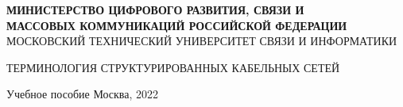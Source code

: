 \begin{titlepage}
\begin{center}
    \MakeUppercase{{\bf Министерство цифрового развития, связи и \\
    массовых коммуникаций Российской федерации}\\
    Московский Технический Университет Связи И Информатики}\par
    \vfill
    \MakeUppercase{Терминология структурированных кабельных сетей}
    \par\par
    Учебное пособие
    \vfill
    {Москва, 2022}
\end{center}
\end{titlepage}